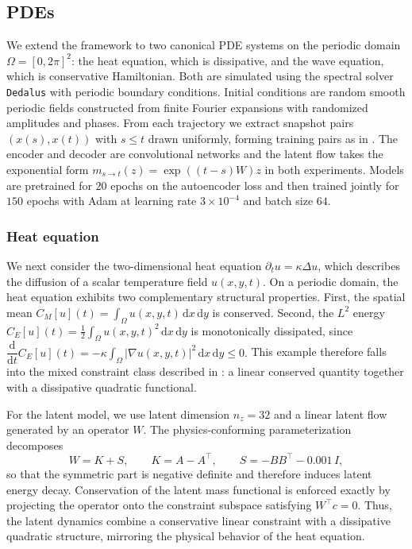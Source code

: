 \documentclass[a4paper,fleqn]{cas-sc}
\theoremstyle{thmstyleone}%
\theoremstyle{thmstyletwo}%
\theoremstyle{thmstylethree}%
\begin{document}
\subsection{PDEs}\label{sec:PDEs}

We extend the framework to two canonical PDE systems on the periodic domain $\Omega=[0,2\pi]^2$: the heat equation, which is dissipative, and the wave equation, which is conservative Hamiltonian. Both are simulated using the spectral solver \texttt{Dedalus} \cite{burns2020dedalus} with periodic boundary conditions. Initial conditions are random smooth periodic fields constructed from finite Fourier expansions with randomized amplitudes and phases. From each trajectory we extract snapshot pairs $(x(s), x(t))$ with $s \leq t$ drawn uniformly, forming training pairs as in . The encoder and decoder are convolutional networks and the latent flow takes the exponential form $m_{s\to t}(z)=\exp((t-s)W)z$ in both experiments. Models are pretrained for $20$ epochs on the autoencoder loss and then trained jointly for $150$ epochs with Adam at learning rate $3\times10^{-4}$ and batch size $64$.

\subsubsection{Heat equation} \label{sec:heat}

We next consider the two-dimensional heat equation $\partial_t u = \kappa \Delta u$, which describes the diffusion of a scalar temperature field $u(x,y,t)$. On a periodic domain, the heat equation exhibits two complementary structural properties. First, the spatial mean $C_M[u](t) = \int_\Omega u(x,y,t)\,\mathrm{d}x\,\mathrm{d}y$ is conserved. Second, the $L^2$ energy $C_E[u](t) = \tfrac12 \int_\Omega u(x,y,t)^2\,\mathrm{d}x\,\mathrm{d}y$
is monotonically dissipated, since $
    \dfrac{\mathrm{d}}{\mathrm{d}t} C_E[u](t) = -\kappa \int_\Omega |\nabla u(x,y,t)|^2\, \mathrm{d}x\,\mathrm{d}y \leq 0. $
This example therefore falls into the mixed constraint class described in : a linear conserved quantity together with a dissipative quadratic functional.

For the latent model, we use latent dimension $n_z=32$ and a linear latent flow generated by an operator $W$. The physics-conforming parameterization decomposes
\[
    W = K + S,  \qquad  K = A-A^\top,  \qquad  S = -BB^\top - 0.001\, I,
\]
so that the symmetric part is negative definite and therefore induces latent energy decay. Conservation of the latent mass functional is enforced exactly by projecting the operator onto the constraint
subspace satisfying $W^\top c = 0$. Thus, the latent dynamics combine a conservative linear constraint with a dissipative quadratic structure, mirroring the physical behavior of the heat equation.
\end{document}

